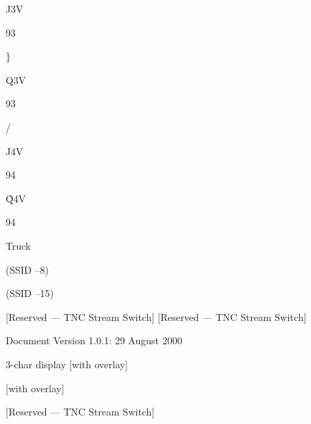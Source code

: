 J3V

93

\}

Q3V

93

/~

J4V

94

\~

Q4V

94

Truck

(SSID –8)

(SSID –15)

[Reserved — TNC Stream Switch]
[Reserved — TNC Stream Switch]

Document Version 1.0.1: 29 August 2000

{3-char display}
[with overlay]

[with overlay]

[Reserved — TNC Stream Switch]


